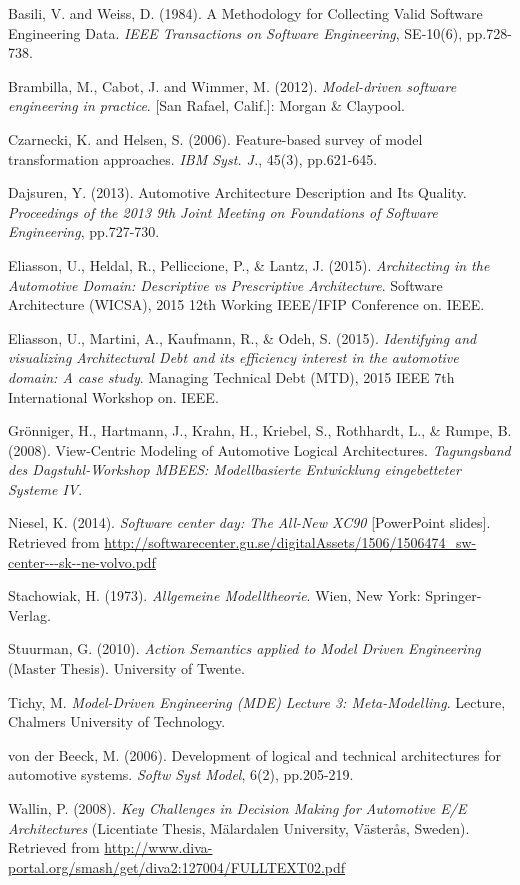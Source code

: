 \begin{thebibliography}{69}

Basili, V. and Weiss, D. (1984). A Methodology for Collecting Valid Software Engineering Data. \textit{IEEE Transactions on Software Engineering}, SE-10(6), pp.728-738.

Brambilla, M., Cabot, J. and Wimmer, M. (2012). \textit{Model-driven software engineering in practice}. [San Rafael, Calif.]: Morgan & Claypool.

Czarnecki, K. and Helsen, S. (2006). Feature-based survey of model transformation approaches. \textit{IBM Syst. J.}, 45(3), pp.621-645.

Dajsuren, Y. (2013). Automotive Architecture Description and Its Quality. \textit{Proceedings of the 2013 9th Joint Meeting on Foundations of Software Engineering}, pp.727-730. 

Eliasson, U., Heldal, R., Pelliccione, P., \& Lantz, J. (2015). \textit{Architecting in the Automotive Domain: Descriptive vs Prescriptive Architecture}. Software Architecture (WICSA), 2015 12th Working IEEE/IFIP Conference on. IEEE.

Eliasson, U., Martini, A., Kaufmann, R., \& Odeh, S. (2015). \textit{Identifying and visualizing Architectural Debt and its efficiency interest in the automotive domain: A case study}. Managing Technical Debt (MTD), 2015 IEEE 7th International Workshop on. IEEE.

Grönniger, H., Hartmann, J., Krahn, H., Kriebel, S., Rothhardt, L., \& Rumpe, B. (2008). View-Centric Modeling of Automotive Logical Architectures. \textit{Tagungsband des Dagstuhl-Workshop MBEES: Modellbasierte Entwicklung eingebetteter Systeme IV}.

Niesel, K. (2014). \textit{Software center day: The All-New XC90} [PowerPoint slides]. Retrieved from \url{http://softwarecenter.gu.se/digitalAssets/1506/1506474_sw-center---sk--ne-volvo.pdf}

Stachowiak, H. (1973). \textit{Allgemeine Modelltheorie}. Wien, New York: Springer-Verlag.

Stuurman, G. (2010). \textit{Action Semantics applied to Model Driven Engineering} (Master Thesis). University of Twente.

Tichy, M. \textit{Model-Driven Engineering (MDE) Lecture 3: Meta-Modelling}. Lecture, Chalmers University of Technology.

von der Beeck, M. (2006). Development of logical and technical architectures for automotive systems. \textit{Softw Syst Model}, 6(2), pp.205-219.

Wallin, P. (2008). \textit{Key Challenges in Decision Making for Automotive E/E Architectures} (Licentiate Thesis, Mälardalen University, Västerås, Sweden). Retrieved from \url{http://www.diva-portal.org/smash/get/diva2:127004/FULLTEXT02.pdf} 

\end{thebibliography}
